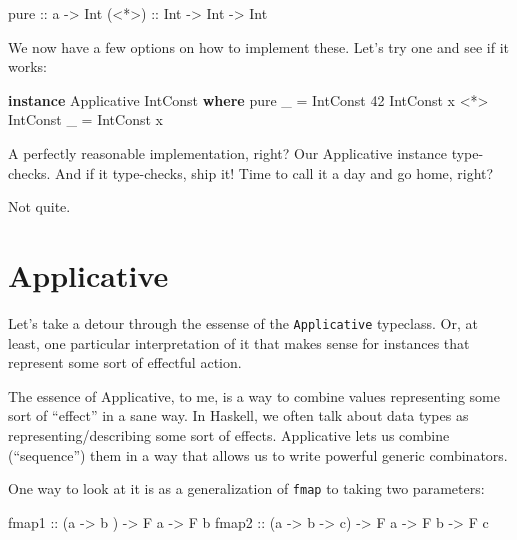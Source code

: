 \documentclass[]{article}
\newenvironment{Shaded}{}{}
\newcommand{\DataTypeTok}[1]{\textcolor[rgb]{0.56,0.13,0.00}{#1}}
\newcommand{\DecValTok}[1]{\textcolor[rgb]{0.25,0.63,0.44}{#1}}
\newcommand{\FunctionTok}[1]{\textcolor[rgb]{0.02,0.16,0.49}{#1}}
\newcommand{\KeywordTok}[1]{\textcolor[rgb]{0.00,0.44,0.13}{\textbf{#1}}}
\newcommand{\NormalTok}[1]{#1}
\newcommand{\OtherTok}[1]{\textcolor[rgb]{0.00,0.44,0.13}{#1}}
\begin{document}
\begin{Shaded}
\begin{Highlighting}[]
\NormalTok{pure}\OtherTok{  ::}\NormalTok{ a }\OtherTok{->} \DataTypeTok{Int}
\OtherTok{(<*>) ::} \DataTypeTok{Int} \OtherTok{->} \DataTypeTok{Int} \OtherTok{->} \DataTypeTok{Int}
\end{Highlighting}
\end{Shaded}

We now have a few options on how to implement these. Let's try one and see if it
works:

\begin{Shaded}
\begin{Highlighting}[]
\KeywordTok{instance} \DataTypeTok{Applicative} \DataTypeTok{IntConst} \KeywordTok{where}
\NormalTok{    pure _                    }\FunctionTok{=} \DataTypeTok{IntConst} \DecValTok{42}
    \DataTypeTok{IntConst}\NormalTok{ x }\FunctionTok{<*>} \DataTypeTok{IntConst}\NormalTok{ _ }\FunctionTok{=} \DataTypeTok{IntConst}\NormalTok{ x}
\end{Highlighting}
\end{Shaded}

A perfectly reasonable implementation, right? Our Applicative instance
type-checks. And if it type-checks, ship it! Time to call it a day and go home,
right?

Not quite.

\hypertarget{applicative}{%
\section{Applicative}\label{applicative}}

Let's take a detour through the essense of the \texttt{Applicative} typeclass.
Or, at least, one particular interpretation of it that makes sense for instances
that represent some sort of effectful action.

The essence of Applicative, to me, is a way to combine values representing some
sort of ``effect'' in a sane way. In Haskell, we often talk about data types as
representing/describing some sort of effects. Applicative lets us combine
(``sequence'') them in a way that allows us to write powerful generic
combinators.

One way to look at it is as a generalization of \texttt{fmap} to taking two
parameters:

\begin{Shaded}
\begin{Highlighting}[]
\OtherTok{fmap1 ::}\NormalTok{ (a }\OtherTok{->}\NormalTok{ b     ) }\OtherTok{->} \DataTypeTok{F}\NormalTok{ a }\OtherTok{->} \DataTypeTok{F}\NormalTok{ b}
\OtherTok{fmap2 ::}\NormalTok{ (a }\OtherTok{->}\NormalTok{ b }\OtherTok{->}\NormalTok{ c) }\OtherTok{->} \DataTypeTok{F}\NormalTok{ a }\OtherTok{->} \DataTypeTok{F}\NormalTok{ b }\OtherTok{->} \DataTypeTok{F}\NormalTok{ c}
\end{Highlighting}
\end{Shaded}
\end{document}
